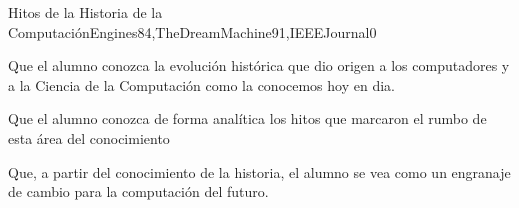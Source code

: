 \begin{syllabus}
\begin{unit}{Hitos de la Historia de la Computación}{Engines84,TheDreamMachine91,IEEEJournal}{0}
   \begin{unitgoals}
     	\item Que el alumno conozca la evolución histórica que dio origen a los computadores y a la Ciencia de la Computación como la conocemos hoy en dia.
	\item Que el alumno conozca de forma analítica los hitos que marcaron el rumbo de esta área del conocimiento
	\item Que, a partir del conocimiento de la historia, el alumno se vea como un engranaje de cambio para la computación del futuro.
   \end{unitgoals}
\end{unit}

\begin{coursebibliography}
\end{coursebibliography}
\end{syllabus}

